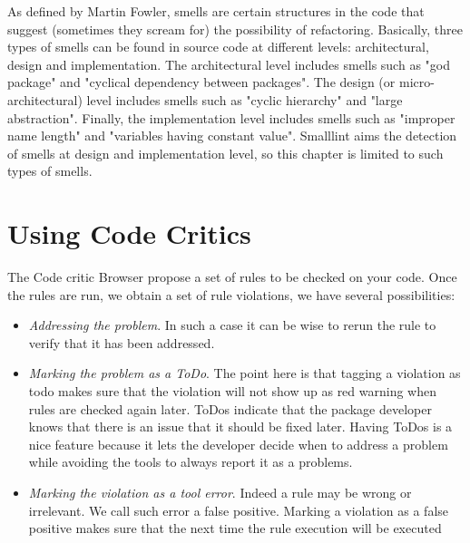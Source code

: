 \documentclass[a4paper,10pt,twoside]{book}
\begin{document}
As defined by Martin Fowler, smells are certain structures in the code that suggest (sometimes they scream for) the possibility of refactoring.
Basically, three types of smells can be found in source code at different levels: architectural, design and implementation. The architectural level includes smells such as "god package" and "cyclical dependency between packages". The design (or micro-architectural) level includes smells such as "cyclic hierarchy" and "large abstraction". Finally, the implementation level includes smells such as "improper name length" and "variables having constant value". Smalllint aims the detection of smells at design and implementation level, so this chapter is limited  to such types of smells.


\section{Using Code Critics}
The Code critic Browser propose a set of rules to be checked on your code. 
Once the rules are run, we obtain a set of rule violations, we have several possibilities:

\begin{itemize}
\item \emph{Addressing the problem}. In such a case it can be wise to rerun the rule to verify that it has been addressed.

\item \emph{Marking the problem as a ToDo}. The point here is that tagging a violation as todo makes sure that the violation will not show up as red warning when rules are checked again later. ToDos indicate that the package developer knows that there is an issue that it should be fixed later. Having ToDos is a nice feature because it lets the developer decide when to address a problem while avoiding the tools to always report it as a problems. 

\item \emph{Marking the violation as a tool error}. Indeed a rule may be wrong or irrelevant. We call such error a false positive. Marking a violation as a false positive makes sure that the next time the rule execution will be executed
\end{itemize}
\end{document}

